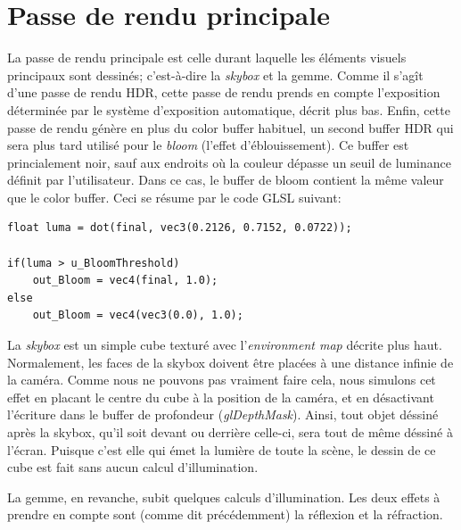 \documentclass[a4paper,12pt]{article}
\begin{document}
\section{Passe de rendu principale}
La passe de rendu principale est celle durant laquelle les éléments visuels principaux sont dessinés; c'est-à-dire
la \emph{skybox} et la gemme. Comme il s'agît d'une passe de rendu HDR, cette passe de rendu prends en compte
l'exposition déterminée par le système d'exposition automatique, décrit plus bas. Enfin, cette passe de rendu
génère en plus du color buffer habituel, un second buffer HDR qui sera plus tard utilisé pour le \emph{bloom}
(l'effet d'éblouissement). Ce buffer est princialement noir, sauf aux endroits où la couleur dépasse un
seuil de luminance définit par l'utilisateur. Dans ce cas, le buffer de bloom contient la même valeur que le color
buffer. Ceci se résume par le code GLSL suivant:

\begin{lstlisting}
float luma = dot(final, vec3(0.2126, 0.7152, 0.0722));

if(luma > u_BloomThreshold)
    out_Bloom = vec4(final, 1.0);
else
    out_Bloom = vec4(vec3(0.0), 1.0);
\end{lstlisting}

La \emph{skybox} est un simple cube texturé avec l'\emph{environment map} décrite plus haut. Normalement, les faces
de la skybox doivent être placées à une distance infinie de la caméra. Comme nous ne pouvons pas vraiment faire cela,
nous simulons cet effet en placant le centre du cube à la position de la caméra, et en désactivant l'écriture dans le buffer
de profondeur (\emph{glDepthMask}). Ainsi, tout objet déssiné après la skybox, qu'il soit devant ou derrière
celle-ci, sera tout de même déssiné à l'écran. Puisque c'est elle qui émet la lumière de toute la scène, le dessin de
ce cube est fait sans aucun calcul d'illumination.

La gemme, en revanche, subit quelques calculs d'illumination. Les deux effets à prendre en compte sont (comme dit
précédemment) la réflexion et la réfraction.
\end{document}
